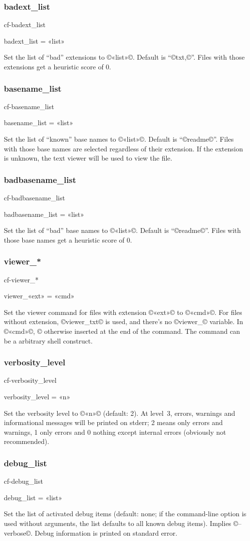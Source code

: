 \documentclass[a4paper, oneside]{scrartcl}
\newif\ifframed
\newenvironment{cmdsubsub}[2]{%
  \framedfalse \commandes\subsubsection{#1}{#2}%
  }{%
  \endcommandes}
\begin{document}
\begin{cmdsubsub}{badext_list}{cf-badext_list}
  badext_list = «list»
\end{cmdsubsub}

Set the list of ``bad'' extensions to ©«list»©.  Default is ``©txt,©''. Files
with those extensions get a heuristic score of 0.

\begin{cmdsubsub}{basename_list}{cf-basename_list}
  basename_list = «list»
\end{cmdsubsub}

Set the list of ``known'' base names to ©«list»©.  Default is ``©readme©''.
Files with those base names are selected regardless of their extension. If the
extension is unknown, the text viewer will be used to view the file.

\begin{cmdsubsub}{badbasename_list}{cf-badbasename_list}
  badbasename_list = «list»
\end{cmdsubsub}

Set the list of ``bad'' base names to ©«list»©.  Default is ``©readme©''. Files
with those base names get a heuristic score of 0.

\begin{cmdsubsub}{viewer_*}{cf-viewer_*}
  viewer_«ext» = «cmd»
\end{cmdsubsub}

Set the viewer command for files with extension ©«ext»© to ©«cmd»©. For files
without extension, ©viewer_txt© is used, and there's no ©viewer_© variable.
In ©«cmd»©, ©%
otherwise inserted at the end of the command.  The command can be a arbitrary
shell construct.

\begin{cmdsubsub}{verbosity_level}{cf-verbosity_level}
  verbosity_level = «n»
\end{cmdsubsub}

Set the verbosity level to ©«n»© (default: 2). At level~3, errors, warnings and
informational messages will be printed on stderr; 2 means only errors and
warnings, 1 only errors and 0 nothing except internal errors (obviously not
recommended).

\begin{cmdsubsub}{debug_list}{cf-debug_list}
  debug_list = «list»
\end{cmdsubsub}

Set the list of activated debug items (default: none; if the command-line
option is used without arguments, the list defaults to all known debug items).
Implies ©--verbose©. Debug information is printed on standard error.
\end{document}
